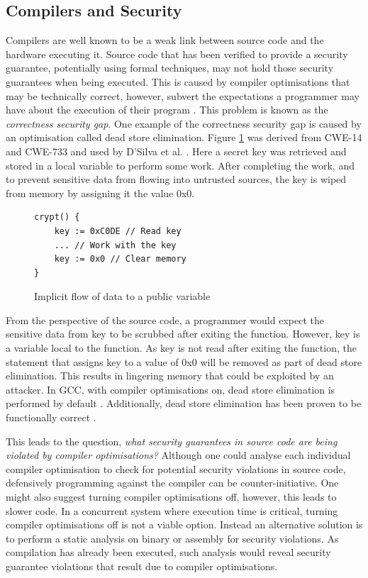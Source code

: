 \documentclass[twocolumn]{article}
\begin{document}
\subsection{Compilers and Security}
Compilers are well known to be a weak link between source code and the hardware executing it. Source code that has been verified to provide a security guarantee, potentially using formal techniques, may not hold those security guarantees when being executed. This is caused by compiler optimisations that may be technically correct, however, subvert the expectations a programmer may have about the execution of their program \cite{d2015correctness}. This problem is known as the \textit{correctness security gap}. One example of the correctness security gap is caused by an optimisation called dead store elimination. Figure \ref{fig:deadstore} was derived from CWE-14 \cite{cwe14} and CWE-733 \cite{cwe733} and used by D'Silva et al. \cite{d2015correctness}. Here a secret key was retrieved and stored in a local variable to perform some work. After completing the work, and to prevent sensitive data from flowing into untrusted sources, the key is wiped from memory by assigning it the value 0x0.

\begin{figure}
    \begin{lstlisting}
crypt() {
    key := 0xC0DE // Read key
    ... // Work with the key
    key := 0x0 // Clear memory
}
        \end{lstlisting}
    \caption{Implicit flow of data to a public variable \cite{d2015correctness}}
    \label{fig:deadstore}
\end{figure}

From the perspective of the source code, a programmer would expect the sensitive data from key to be scrubbed after exiting the function. However, key is a variable local to the function. As key is not read after exiting the function, the statement that assigns key to a value of 0x0 will be removed as part of dead store elimination. This results in lingering memory that could be exploited by an attacker. In GCC, with compiler optimisations on, dead store elimination is performed by default \cite{gccoptimise}. Additionally, dead store elimination has been proven to be functionally correct \cite{benton2004simple}\cite{leroy2006formal}.


This leads to the question, \textit{what security guarantees in source code are being violated by compiler optimisations?} Although one could analyse each individual compiler optimisation to check for potential security violations in source code, defensively programming against the compiler can be counter-initiative. One might also suggest turning compiler optimisations off, however, this leads to slower code. In a concurrent system where execution time is critical, turning compiler optimisations off is not a viable option. Instead an alternative solution is to perform a static analysis on binary or assembly for security violations. As compilation has already been executed, such analysis would reveal security guarantee violations that result due to compiler optimisations.
\end{document}

